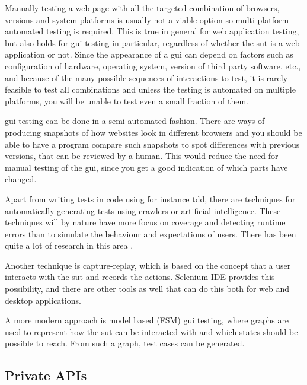 \documentclass[11pt]{article}
\begin{document}
Manually testing a web page with all the targeted combination of browsers, versions and system platforms is usually not a viable option \cite{TestSwarm} so multi-platform automated testing is required. This is true in general for web application testing, but also holds for \gls{gui} testing in particular, regardless of whether the \gls{sut} is a web application or not. Since the appearance of a \gls{gui} can depend on factors such as configuration of hardware, operating system, version of third party software, etc., and because of the many possible sequences of interactions to test, it is rarely feasible to test all combinations and unless the testing is automated on multiple platforms, you will be unable to test even a small fraction of them.

\gls{gui} testing can be done in a semi-automated fashion. There are ways of producing snapshots of how websites look in different browsers and you should be able to have a program compare such snapshots to spot differences with previous versions, that can be reviewed by a human. This would reduce the need for manual testing of the \gls{gui}, since you get a good indication of which parts have changed. %

Apart from writing tests in code using for instance \gls{tdd}, there are techniques for automatically generating tests using crawlers or artificial intelligence. These techniques will by nature have more focus on coverage and detecting runtime errors than to simulate the behaviour and expectations of users. There has been quite a lot of research in this area \cite{AutomatedTesting}\cite{AutomatedAcceptance}\cite{AutomatedAjax}.

Another technique is capture-replay, which is based on the concept that a user interacts with the \gls{sut} and records the actions. Selenium IDE provides this possibility, and there are other tools as well that can do this both for web and desktop applications.

A more modern approach is model based (FSM) \gls{gui} testing, where graphs are used to represent how the \gls{sut} can be interacted with and which states should be possible to reach. From such a graph, test cases can be generated.

\subsection{Private APIs}
\end{document}
